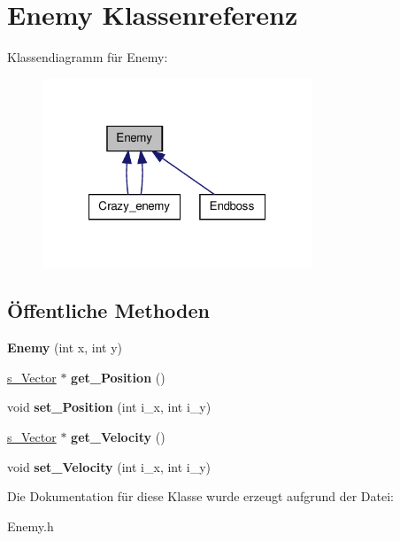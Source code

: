\hypertarget{class_enemy}{\section{Enemy Klassenreferenz}
\label{class_enemy}
}


Klassendiagramm für Enemy\-:
\nopagebreak
\begin{figure}[H]
\begin{center}
\leavevmode
\includegraphics[width=228pt]{class_enemy__inherit__graph}
\end{center}
\end{figure}
\subsection*{Öffentliche Methoden}
\begin{DoxyCompactItemize}
\item 
\hypertarget{class_enemy_a98f0d2110309536798101b88d2d1d8c9}{{\bfseries Enemy} (int x, int y)}\label{class_enemy_a98f0d2110309536798101b88d2d1d8c9}

\item 
\hypertarget{class_enemy_a8894742ec191ae32c4e22014e5af8246}{\hyperlink{structs___vector}{s\-\_\-\-Vector} $\ast$ {\bfseries get\-\_\-\-Position} ()}\label{class_enemy_a8894742ec191ae32c4e22014e5af8246}

\item 
\hypertarget{class_enemy_a39b8b0f9a87bf2a7b6ee8a1f59cefcf4}{void {\bfseries set\-\_\-\-Position} (int i\-\_\-x, int i\-\_\-y)}\label{class_enemy_a39b8b0f9a87bf2a7b6ee8a1f59cefcf4}

\item 
\hypertarget{class_enemy_a01024ba4588c4ab2efc9a9e0a960c983}{\hyperlink{structs___vector}{s\-\_\-\-Vector} $\ast$ {\bfseries get\-\_\-\-Velocity} ()}\label{class_enemy_a01024ba4588c4ab2efc9a9e0a960c983}

\item 
\hypertarget{class_enemy_ab026b4302720f1676653285b27babd59}{void {\bfseries set\-\_\-\-Velocity} (int i\-\_\-x, int i\-\_\-y)}\label{class_enemy_ab026b4302720f1676653285b27babd59}

\end{DoxyCompactItemize}


Die Dokumentation für diese Klasse wurde erzeugt aufgrund der Datei\-:\begin{DoxyCompactItemize}
\item 
Enemy.\-h\end{DoxyCompactItemize}
